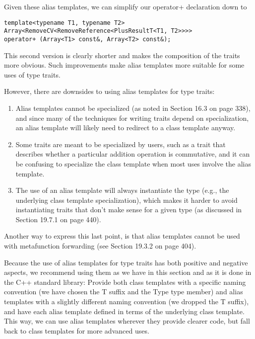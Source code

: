Given these alias templates, we can simplify our operator+ declaration down to

\begin{lstlisting}[style=styleCXX]
template<typename T1, typename T2>
Array<RemoveCV<RemoveReference<PlusResultT<T1, T2>>>>
operator+ (Array<T1> const&, Array<T2> const&);
\end{lstlisting}

This second version is clearly shorter and makes the composition of the traits more obvious. Such improvements make alias templates more suitable for some uses of type traits.

However, there are downsides to using alias templates for type traits:

\begin{enumerate}
\item
Alias templates cannot be specialized (as noted in Section 16.3 on page 338), and since many of the techniques for writing traits depend on specialization, an alias template will likely need to redirect to a class template anyway.

\item 
Some traits are meant to be specialized by users, such as a trait that describes whether a particular addition operation is commutative, and it can be confusing to specialize the class template when most uses involve the alias template.

\item
The use of an alias template will always instantiate the type (e.g., the underlying class template specialization), which makes it harder to avoid instantiating traits that don’t make sense for a given type (as discussed in Section 19.7.1 on page 440).
\end{enumerate}

Another way to express this last point, is that alias templates cannot be used with metafunction forwarding (see Section 19.3.2 on page 404).

Because the use of alias templates for type traits has both positive and negative aspects, we recommend using them as we have in this section and as it is done in the C++ standard library: Provide both class templates with a specific naming convention (we have chosen the T suffix and the Type type member) and alias templates with a slightly different naming convention (we dropped the T suffix), and have each alias template defined in terms of the underlying class template. This way, we can use alias templates wherever they provide clearer code, but fall back to class templates for more advanced uses.

